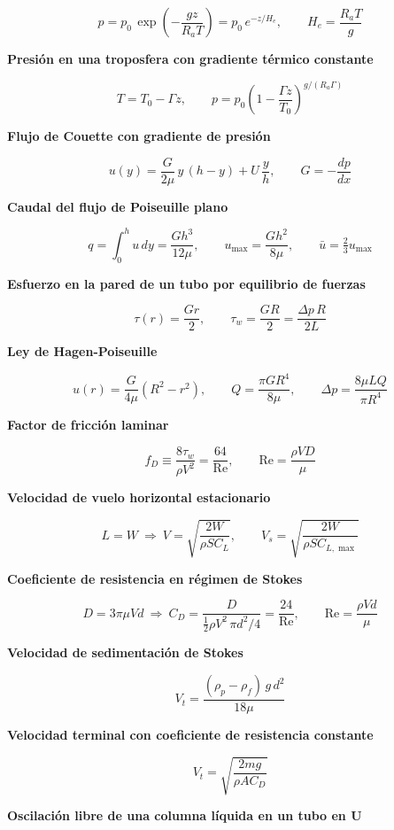\documentclass[10pt,openany]{book}
\begin{document}
\[
p = p_0\,\exp\!\left(-\frac{g z}{R_a T}\right) = p_0\,e^{-z/H_e},\qquad H_e = \frac{R_a T}{g}
\]

\noindent\textbf{Presión en una troposfera con gradiente térmico constante}

\[
T = T_0 - \Gamma z,\qquad p = p_0\left(1 - \frac{\Gamma z}{T_0}\right)^{g/(R_a\Gamma)}
\]

\noindent\textbf{Flujo de Couette con gradiente de presión}

\[
u(y) = \frac{G}{2\mu}\,y\,(h - y) + U\,\frac{y}{h},\qquad G = -\frac{dp}{dx}
\]

\noindent\textbf{Caudal del flujo de Poiseuille plano}

\[
q = \int_0^{h} u\,dy = \frac{G h^{3}}{12\mu},\qquad u_{\max} = \frac{G h^{2}}{8\mu},\qquad \bar u = \tfrac{2}{3}u_{\max}
\]

\noindent\textbf{Esfuerzo en la pared de un tubo por equilibrio de fuerzas}

\[
\tau(r) = \frac{G r}{2},\qquad \tau_w = \frac{G R}{2} = \frac{\Delta p\,R}{2L}
\]

\noindent\textbf{Ley de Hagen-Poiseuille}

\[
u(r) = \frac{G}{4\mu}\left(R^{2} - r^{2}\right),\qquad Q = \frac{\pi G R^{4}}{8\mu},\qquad \Delta p = \frac{8\mu L Q}{\pi R^{4}}
\]

\noindent\textbf{Factor de fricción laminar}

\[
f_D \equiv \frac{8\tau_w}{\rho V^{2}} = \frac{64}{\mathrm{Re}},\qquad \mathrm{Re} = \frac{\rho V D}{\mu}
\]

\noindent\textbf{Velocidad de vuelo horizontal estacionario}

\[
L = W\ \Rightarrow\ V = \sqrt{\frac{2W}{\rho S C_L}},\qquad V_s = \sqrt{\frac{2W}{\rho S C_{L,\max}}}
\]

\noindent\textbf{Coeficiente de resistencia en régimen de Stokes}

\[
D = 3\pi\mu V d\ \Rightarrow\ C_D = \frac{D}{\tfrac12\rho V^{2}\,\pi d^{2}/4} = \frac{24}{\mathrm{Re}},\qquad \mathrm{Re} = \frac{\rho V d}{\mu}
\]

\noindent\textbf{Velocidad de sedimentación de Stokes}

\[
V_t = \frac{(\rho_p - \rho_f)\,g\,d^{2}}{18\mu}
\]

\noindent\textbf{Velocidad terminal con coeficiente de resistencia constante}

\[
V_t = \sqrt{\frac{2 m g}{\rho A C_D}}
\]

\noindent\textbf{Oscilación libre de una columna líquida en un tubo en U}
\end{document}
